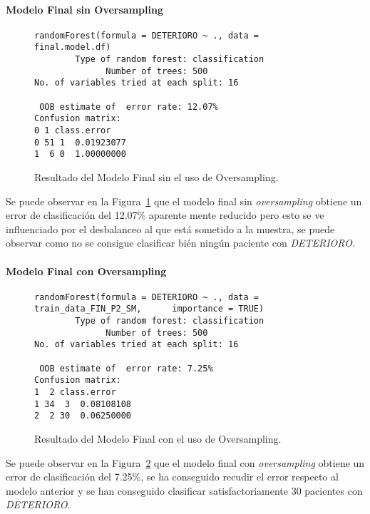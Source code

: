 \paragraph{Modelo Final sin Oversampling}

\begin{figure}[H]
    \centering
    \begin{lstlisting}[frame=single, basicstyle=\small\ttfamily]
        randomForest(formula = DETERIORO ~ ., data = final.model.df) 
        Type of random forest: classification
              Number of trees: 500
No. of variables tried at each split: 16

 OOB estimate of  error rate: 12.07%
Confusion matrix:
0 1 class.error
0 51 1  0.01923077
1  6 0  1.00000000
    \end{lstlisting}
    \caption{Resultado del Modelo Final sin el uso de Oversampling.}
    \label{fig:random_forest_FINAL_NO_SMOTE}
\end{figure}

Se puede observar en la Figura~\ref{fig:random_forest_FINAL_NO_SMOTE} que el modelo final sin \textit{oversampling} obtiene un error de clasificación del 12.07\% aparente mente reducido pero esto se ve influenciado por el desbalanceo al que está sometido a la muestra, se puede observar como no se consigue clasificar bién ningún paciente con \textit{DETERIORO}. 

\paragraph{Modelo Final con Oversampling}

\begin{figure}[H]
    \centering
    \begin{lstlisting}[frame=single, basicstyle=\small\ttfamily]
randomForest(formula = DETERIORO ~ ., data = train_data_FIN_P2_SM,      importance = TRUE) 
        Type of random forest: classification
              Number of trees: 500
No. of variables tried at each split: 16

 OOB estimate of  error rate: 7.25%
Confusion matrix:
1  2 class.error
1 34  3  0.08108108
2  2 30  0.06250000
    \end{lstlisting}
    \caption{Resultado del Modelo Final con el uso de Oversampling.}
    \label{fig:random_forest_FINAL_SMOTE}
\end{figure}

Se puede observar en la Figura~\ref{fig:random_forest_FINAL_SMOTE} que el modelo final con \textit{oversampling} obtiene un error de clasificación del 7.25\%, se ha conseguido recudir el error respecto al modelo anterior y se han conseguido clasificar satisfactoriamente 30 pacientes con \textit{DETERIORO}.

